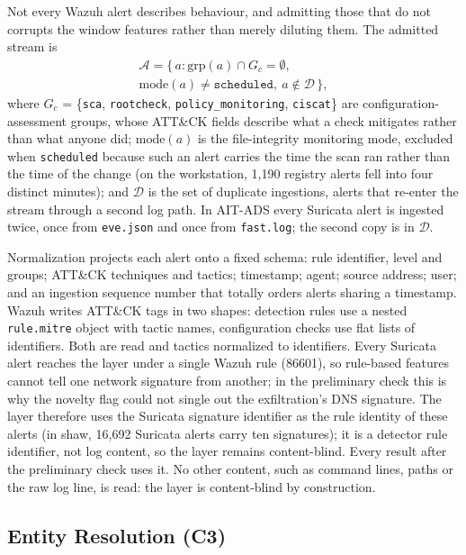 \documentclass[conference]{IEEEtran}
\begin{document}
Not every Wazuh alert describes behaviour, and admitting those that do not corrupts the window features rather than merely diluting them. The admitted stream is
\begin{multline}
\mathcal{A} = \{\, a : \mathrm{grp}(a) \cap G_c = \emptyset, \\
\mathrm{mode}(a) \neq \texttt{scheduled},\ a \notin \mathcal{D} \,\},
\end{multline}
where $G_c$ = \{\texttt{sca}, \texttt{rootcheck}, \texttt{policy\_monitoring}, \texttt{ciscat}\} are configuration-assessment groups, whose ATT\&CK fields describe what a check mitigates rather than what anyone did; $\mathrm{mode}(a)$ is the file-integrity monitoring mode, excluded when \texttt{scheduled} because such an alert carries the time the scan ran rather than the time of the change (on the workstation, 1{,}190 registry alerts fell into four distinct minutes); and $\mathcal{D}$ is the set of duplicate ingestions, alerts that re-enter the stream through a second log path. In AIT-ADS every Suricata alert is ingested twice, once from \texttt{eve.json} and once from \texttt{fast.log}; the second copy is in $\mathcal{D}$.

Normalization projects each alert onto a fixed schema: rule identifier, level and groups; ATT\&CK techniques and tactics; timestamp; agent; source address; user; and an ingestion sequence number that totally orders alerts sharing a timestamp. Wazuh writes ATT\&CK tags in two shapes: detection rules use a nested \texttt{rule.mitre} object with tactic names, configuration checks use flat lists of identifiers. Both are read and tactics normalized to identifiers. Every Suricata alert reaches the layer under a single Wazuh rule (86601), so rule-based features cannot tell one network signature from another; in the preliminary check this is why the novelty flag could not single out the exfiltration's DNS signature. The layer therefore uses the Suricata signature identifier as the rule identity of these alerts (in shaw, 16{,}692 Suricata alerts carry ten signatures); it is a detector rule identifier, not log content, so the layer remains content-blind. Every result after the preliminary check uses it. No other content, such as command lines, paths or the raw log line, is read: the layer is content-blind by construction.

\subsection{Entity Resolution (C3)}
\end{document}
